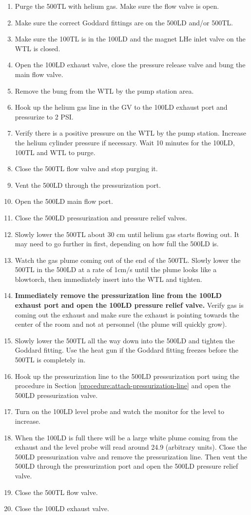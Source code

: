 \begin{enumerate}
 \item Purge the 500TL with helium gas.  Make sure the flow valve is open.
 \item Make sure the correct Goddard fittings are on the 500LD and/or 500TL.
 \item Make sure the 100TL is in the 100LD and the magnet LHe inlet valve on the WTL is closed.
 \item Open the 100LD exhaust valve, close the pressure release valve and bung the main flow valve.
 \item Remove the bung from the WTL by the pump station area.
 \item Hook up the helium gas line in the GV to the 100LD exhaust port and pressurize to 2 PSI.
 \item Verify there is a positive pressure on the WTL by the pump station.  Increase the helium cylinder pressure if necessary.  Wait 10 minutes for the 100LD, 100TL and WTL to purge.
 \item Close the 500TL flow valve and stop purging it.
 \item Vent the 500LD through the pressurization port.
 \item Open the 500LD main flow port.
 \item Close the 500LD pressurization and pressure relief valves.
 \item Slowly lower the 500TL about 30 cm until helium gas starts flowing out.  It may need to go further in first, depending on how full the 500LD is.
 \item Watch the gas plume coming out of the end of the 500TL.  Slowly lower the 500TL in the 500LD at a rate of 1cm/s until the plume looks like a blowtorch, then immediately insert into the WTL and tighten.
 \item \textbf{Immediately remove the pressurization line from the 100LD exhaust port and open the 100LD pressure relief valve.} Verify gas is coming out the exhaust and make sure the exhaust is pointing towards the center of the room and not at personnel (the plume will quickly grow).
 \item Slowly lower the 500TL all the way down into the 500LD and tighten the Goddard fitting.  Use the heat gun if the Goddard fitting freezes before the 500TL is completely in.
 \item Hook up the pressurization line to the 500LD pressurization port using the procedure in Section \ref{procedure:attach-pressurization-line} and open the 500LD pressurization valve.
 \item Turn on the 100LD level probe and watch the monitor for the level to increase.
 \item When the 100LD is full there will be a large white plume coming from the exhaust and the level probe will read around 24.9 (arbitrary units). Close the 500LD pressurization valve and remove the pressurization line.  Then vent the 500LD through the pressurization port and open the 500LD pressure relief valve.
 \item Close the 500TL flow valve.
 \item Close the 100LD exhaust valve.
\end{enumerate}


